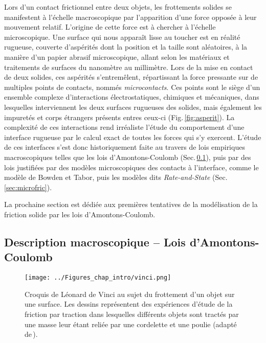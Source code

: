 Lors d'un contact frictionnel entre deux objets, les frottements solides se manifestent à l'échelle macroscopique par l'apparition d'une force opposée à leur mouvement relatif. L'origine de cette force est à chercher à l'échelle microscopique. Une surface qui nous apparaît lisse au toucher est en réalité rugueuse, couverte d'aspérités dont la position et la taille sont aléatoires, à la manière d'un papier abrasif microscopique, allant selon les matériaux et traitements de surfaces du nanomètre au millimètre. Lors de la mise en contact de deux solides, ces aspérités s'entremêlent, répartissant la force pressante sur de multiples points de contacts, nommés \textit{microcontacts}. Ces points sont le siège d'un ensemble complexe d'interactions électrostatiques, chimiques et mécaniques, dans lesquelles interviennent les deux surfaces rugueuses des solides, mais également les impuretés et corps étrangers présents entres ceux-ci (Fig.\,\ref{fig:asperit}). La complexité de ces interactions rend irréaliste l'étude du comportement d'une interface rugueuse par le calcul exact de toutes les forces qui s'y exercent. L'étude de ces interfaces s'est donc historiquement faite au travers de lois empiriques macroscopiques telles que les lois d'Amontons-Coulomb (Sec.\,\ref{sec:coulomb}), puis par des lois justifiées par des modèles microscopiques des contacts à l'interface, comme le modèle de Bowden et Tabor, puis les modèles dits \textit{Rate-and-State} (Sec.\,\ref{sec:microfric}).

La prochaine section est dédiée aux premières tentatives de la modélisation de la friction solide par les lois d'Amontons-Coulomb.


\subsection{Description macroscopique -- Lois d'Amontons-Coulomb}
\label{sec:coulomb}


\begin{figure}[htb]
\centering
\texttt{[image: ../Figures\_chap\_intro/vinci.png]}
\caption[Croquis de Léonard de Vinci]{Croquis de Léonard de Vinci au sujet du frottement d'un objet sur une surface. Les dessins représentent des expériences d'étude de la friction par traction dans lesquelles différents objets sont tractés par une masse leur étant reliée par une cordelette et une poulie (adapté de\,\cite{hutchings_leonardo_2016}).}
\label{fig:vinci}
\end{figure}

